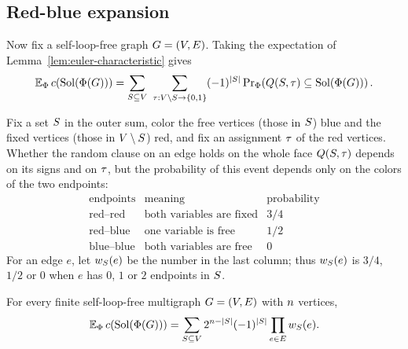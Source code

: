 \subsection{Red-blue expansion}\label{subsec:red-blue-expansion}

Now fix a self-loop-free graph \(G=(V,E)\). Taking the expectation of
Lemma~\ref{lem:euler-characteristic} gives
\begin{equation}\label{eq:expected-faces}
  \E_{\Phi}\,\solcomp{\rform{\Gin}}
  =\sum_{\freeset\subseteq \Vset}\ \sum_{\fixasg:\Vset\setminus \freeset\to\{0,1\}}
  (-1)^{|\freeset|}
  \Prx[\Phi]{\face{\freeset}{\fixasg}\subseteq\Sol(\rform{\Gin})}.
\end{equation}

Fix a set \(S\) in the outer sum, color the free vertices (those in
\(S\)) blue and the fixed vertices (those in \(V\setminus S\))
red, and fix an assignment \(\tau\) of the red vertices. Whether the random
clause on an edge holds on the whole face \(Q(S,\tau)\) depends
on its signs and on \(\tau\), but the probability of this event depends only
on the colors of the two endpoints:
\[
\begin{array}{c|c|c}
\text{endpoints} & \text{meaning} & \text{probability}\\
\hline
\text{red--red} & \text{both variables are fixed} & 3/4\\
\text{red--blue} & \text{one variable is free} & 1/2\\
\text{blue--blue} & \text{both variables are free} & 0
\end{array}
\]
For an edge \(e\), let \(w_{S}(e)\) be the number in the last
column; thus \(w_{S}(e)\) is \(3/4\), \(1/2\) or \(0\) when \(e\)
has \(0\), \(1\) or \(2\) endpoints in \(S\).

\begin{lemma}\label{lem:red-blue-expansion}
For every finite self-loop-free multigraph \(G=(V,E)\) with
\(n\) vertices,
\begin{equation}\label{eq:red-blue}
  \mathbb{E}_{\Phi}\,c(\operatorname{Sol}(\Phi(G)))=
  \sum_{S\subseteq V}
  2^{n-|S|}(-1)^{|S|}
  \prod_{e\in E}w_{S}(e).
\end{equation}
\end{lemma}

